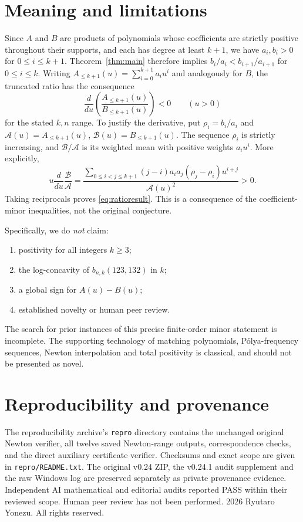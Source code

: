 \documentclass[11pt,a4paper]{article}
\begin{document}
\section{Meaning and limitations}\label{sec:meaning}
Since $A$ and $B$ are products of polynomials whose coefficients are
strictly positive throughout their supports, and each has degree at
least $k+1$, we have $a_i,b_i>0$ for $0\le i\le k+1$.
Theorem~\ref{thm:main} therefore implies
$b_i/a_i<b_{i+1}/a_{i+1}$ for $0\le i\le k$.
Writing $A_{\le k+1}(u)=\sum_{i=0}^{k+1}a_iu^i$ and analogously
for $B$, the truncated ratio has the consequence
\begin{equation}\label{eq:ratioresult}
\frac{d}{du}\left(\frac{A_{\le k+1}(u)}{B_{\le k+1}(u)}\right)<0
\qquad (u>0)
\end{equation}
for the stated $k,n$ range. To justify the derivative, put
$\rho_i=b_i/a_i$ and
$\mathcal{A}(u)=A_{\le k+1}(u)$,
$\mathcal{B}(u)=B_{\le k+1}(u)$.
The sequence $\rho_i$ is strictly increasing, and
$\mathcal{B}/\mathcal{A}$ is its weighted mean with positive
weights $a_i u^i$. More explicitly,
\[
u\frac{d}{du}\frac{\mathcal{B}}{\mathcal{A}}
=\frac{\sum_{0\le i<j\le k+1}(j-i)a_ia_j
(\rho_j-\rho_i)u^{i+j}}{\mathcal{A}(u)^2}>0.
\]
Taking reciprocals proves \eqref{eq:ratioresult}.
This is a consequence of the coefficient-minor inequalities,
not the original conjecture.

Specifically, we do \emph{not} claim:
\begin{enumerate}[nosep]
\item positivity for all integers $k\ge3$;
\item the log-concavity of $b_{n,k}(123,132)$ in $k$;
\item a global sign for $A(u)-B(u)$;
\item established novelty or human peer review.
\end{enumerate}
The search for prior instances of this precise finite-order
minor statement is incomplete. The supporting technology of matching
polynomials, P\'olya-frequency sequences, Newton interpolation and
total positivity is classical, and should not be presented as novel.

\section*{Reproducibility and provenance}
The reproducibility archive's \texttt{repro} directory contains the unchanged
original Newton verifier, all twelve saved Newton-range outputs,
correspondence checks, and the direct auxiliary certificate verifier.
Checksums and exact scope are given in \texttt{repro/README.txt}.
The original v0.24 ZIP, the v0.24.1 audit supplement and the raw Windows
log are preserved separately as private provenance evidence. Independent
AI mathematical and editorial audits reported PASS within their reviewed
scope. Human peer review has not been performed.
\textcopyright{} 2026 Ryutaro Yonezu. All rights reserved.
\end{document}
